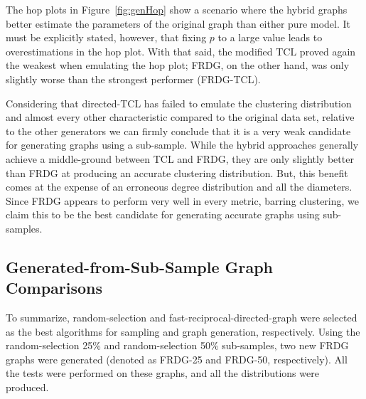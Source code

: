 \documentclass[pdftex,11pt,a4paper,twocolumn]{scrartcl}
\begin{document}
\begin{table}[h]
\centering
{}
\caption{Comparison of Generated Graphs}
\label{table:degGen}
\end{table}

The hop plots in Figure~\ref{fig:genHop} show a scenario where the hybrid graphs  better estimate the parameters of the original graph than either pure model. It must be explicitly stated, however, that fixing $p$ to a large value leads to overestimations in the hop plot. With that said, the modified TCL proved again the weakest when emulating the hop plot; FRDG, on the other hand, was only slightly worse than the strongest performer (FRDG-TCL). 

Considering that directed-TCL has failed to emulate the clustering distribution and almost every other characteristic compared to the original data set, relative to the other generators we can firmly conclude that it is a very weak candidate for generating graphs using a sub-sample. While the hybrid approaches generally achieve a middle-ground between TCL and FRDG, they are only slightly better than FRDG at producing an accurate clustering distribution. But, this benefit comes at the expense of an erroneous degree distribution and all the diameters. Since FRDG appears to perform very well in every metric, barring clustering, we claim this to be the best candidate for generating accurate graphs using sub-samples. 


\subsection{Generated-from-Sub-Sample Graph Comparisons} 
\label{sec:bestsComp}
To summarize, random-selection and fast-reciprocal-directed-graph were selected as the best algorithms for sampling and graph generation, respectively. Using the random-selection 25\% and random-selection 50\% sub-samples, two new FRDG graphs were generated (denoted as FRDG-25 and FRDG-50, respectively). All the tests were performed on these graphs, and all the distributions were produced. 
\end{document}
